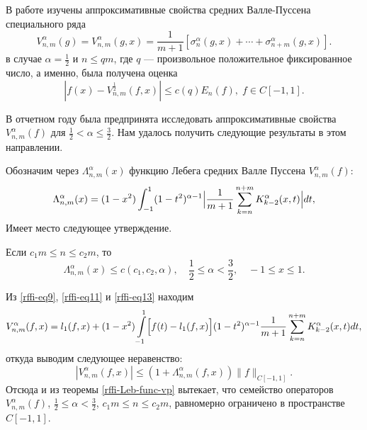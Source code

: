 В работе \cite{rffi-15} изучены аппроксимативные свойства средних Валле-Пуссена специального ряда
\begin{equation}\label{rffi-eq13}
V_{n,m}^\alpha(g)=V_{n,m}^\alpha(g,x)=\frac{1}{m+1}[\sigma_n^\alpha(g,x)+\cdots+\sigma_{n+m}^\alpha(g,x)].
\end{equation}
в случае $\alpha=\frac{1}{2}$ и $n \le qm$, где $q$ --- произвольное положительное фиксированное число, а именно, была получена оценка
\begin{equation}\label{rffi-est-Vp05}
|f(x)-V_{n,m}^\frac{1}{2}(f,x)| \le c(q) E_n(f), \; f \in C[-1,1].
\end{equation}

В отчетном году была предпринята  исследовать аппроксимативные свойства $V_{n,m}^\alpha(f)$ для $\frac{1}{2} < \alpha \le \frac{3}{2}$. Нам удалось получить следующие результаты в этом направлении.

Обозначим через $\Lambda_{n,m}^\alpha(x)$ функцию Лебега средних Валле Пуссена $V_{n,m}^\alpha(f)$:
\begin{equation*}
\Lambda_{n,m}^\alpha(x)=
(1-x^2)\int_{-1}^{1}(1-t^2)^{\alpha-1}\Bigl|
\frac{1}{m+1}\sum\limits_{k=n}^{n+m}K^\alpha_{k-2}(x,t)
\Bigr|dt,
\end{equation*}
Имеет место следующее утверждение.
\begin{theorem}\label{rffi-Leb-func-vp}
Если $c_1 m \le n \le c_2 m$, то
\begin{equation}
  \Lambda_{n,m}^\alpha(x)\le c(c_1, c_2, \alpha), \quad \frac12 \le \alpha < \frac32, \quad -1 \le x \le 1.
\end{equation}
\end{theorem}

Из \eqref{rffi-eq9}, \eqref{rffi-eq11} и \eqref{rffi-eq13} находим
\begin{equation*}
V_{n,m}^\alpha(f,x)=
l_1(f,x)+(1-x^2)\int\limits_{-1}^{1}
\Bigl[
f(t)-l_1(f,x)
\Bigr]
(1-t^2)^{\alpha-1}\frac{1}{m+1}\sum\limits_{k=n}^{n+m}K_{k-2}^\alpha(x,t)dt,
\end{equation*}
откуда выводим следующее неравенство:
\begin{equation*}
|V_{n,m}^\alpha(f,x)| \le (1+\Lambda_{n,m}^\alpha(f,x))\|f\|_{C[-1,1]}.
\end{equation*}
Отсюда и из теоремы \ref{rffi-Leb-func-vp} вытекает, что семейство операторов $V_{n,m}^\alpha(f)$, $\frac12\le \alpha < \frac32$, $c_1m \le n\le c_2m$, равномерно ограничено в пространстве $C[-1,1]$.


